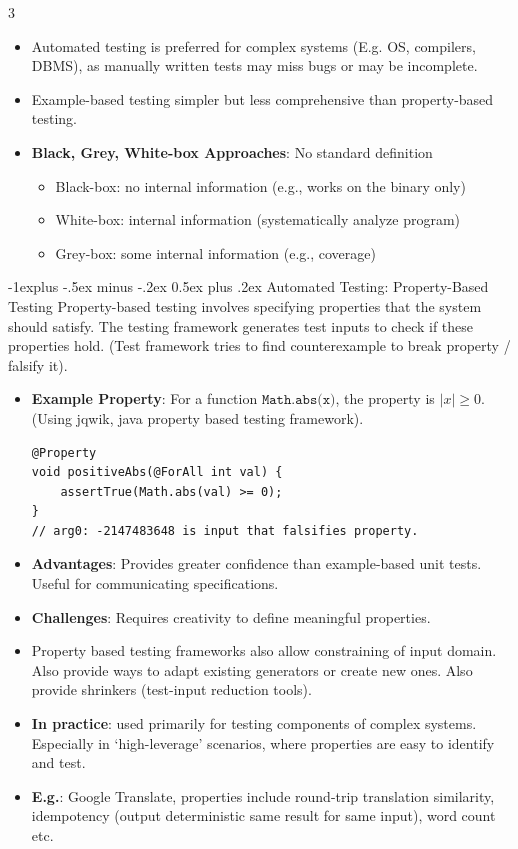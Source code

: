 \documentclass[a4paper, 10pt, landscape]{article}
\makeatletter
\renewcommand{\subsection}{\@startsection{subsection}{2}{0mm}%
                                {-1explus -.5ex minus -.2ex}%
                                {0.5ex plus .2ex}%
                                {\normalfont\normalsize\bfseries}}
\makeatother
\begin{document}
\begin{multicols*}{3}
\begin{itemize}
\item Automated testing is preferred for complex systems (E.g. OS, compilers, DBMS), as manually written tests may miss bugs or may be incomplete.
\item Example-based testing simpler but less comprehensive than property-based testing.
\item \textbf{Black, Grey, White-box Approaches}: No standard definition
	\begin{itemize}
	\item Black-box: no internal information (e.g., works on the binary only)
	\item White-box: internal information (systematically analyze program)
	\item Grey-box: some internal information (e.g., coverage)
	\end{itemize}
\end{itemize}

\subsection{Automated Testing: Property-Based Testing}
Property-based testing involves specifying properties that the system should satisfy. The testing framework generates test inputs to check if these properties hold. (Test framework tries to find counterexample to break property / falsify it).

\begin{itemize}
\item \textbf{Example Property}: For a function $ \texttt{Math.abs(x)} $, the property is $ |x| \geq 0 $. (Using jqwik, java property based testing framework).
\begin{verbatim}
@Property
void positiveAbs(@ForAll int val) {
    assertTrue(Math.abs(val) >= 0);
}
// arg0: -2147483648 is input that falsifies property.
\end{verbatim}
\item \textbf{Advantages}: Provides greater confidence than example-based unit tests. Useful for communicating specifications.
\item \textbf{Challenges}: Requires creativity to define meaningful properties.
\item Property based testing frameworks also allow constraining of input domain. Also provide ways to adapt existing generators or create new ones. Also provide shrinkers (test-input reduction tools).
\item \textbf{In practice}: used primarily for testing components of complex systems.  Especially in `high-leverage'
scenarios, where properties are easy to identify and test. 
\item \textbf{E.g.}: Google Translate, properties include round-trip translation similarity, idempotency (output deterministic same result for same input), word count etc.
\end{itemize}


\end{multicols*}
\end{document}
